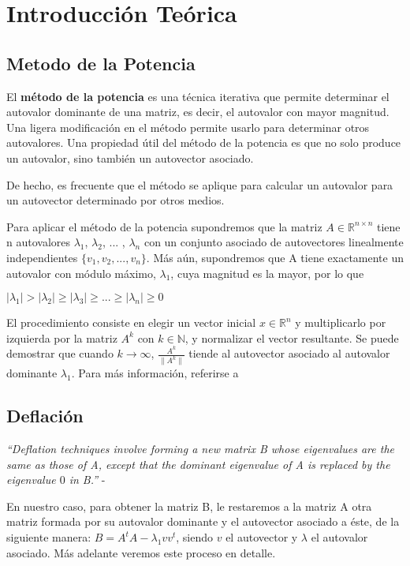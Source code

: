 \section{Introducci\'on Te\'orica}
\subsection{Metodo de la Potencia}
El \textbf{método de la potencia} es una técnica iterativa que permite determinar el autovalor dominante de una matriz, es decir, el autovalor con mayor magnitud. Una ligera modificación en el método permite usarlo para determinar otros autovalores. Una propiedad útil del método de la potencia es que no solo produce un autovalor, sino también un autovector asociado. 

De hecho, es frecuente que el método se aplique para calcular un autovalor para un autovector determinado por otros medios.

Para aplicar el método de la potencia supondremos que la matriz $A \in \mathbb{R}^{n \times n}$ tiene n autovalores $\lambda_1$, $\lambda_2$, ... , $\lambda_n$ con un conjunto asociado de autovectores linealmente independientes $\{v_1,v_2, ..., v_n\}$. Más aún, supondremos que A tiene exactamente un autovalor con módulo máximo, $\lambda_1$, cuya magnitud es la mayor, por lo que 
\begin{center}
$|\lambda_1| > |\lambda_2| \geq |\lambda_3| \geq ... \geq |\lambda_n| \geq 0$
\end{center}

%
%
%
%
%
%

El procedimiento consiste en elegir un vector inicial $x \in \mathbb{R}^n$ y multiplicarlo por
izquierda por la matriz $A^k$ con $k \in \mathbb{N}$, y normalizar el vector resultante. Se puede
demostrar que cuando $k \rightarrow \infty$, $\frac{A^k}{\| A^k \| }$ tiende al autovector asociado
al autovalor  dominante $\lambda_1$. Para más información, referirse a \cite{burden}

\subsection{Deflación}

\textit{``Deflation techniques involve forming a new matrix B whose eigenvalues are the same as
  those of A, except that the dominant eigenvalue of A is replaced by the eigenvalue $0$ in B.''} -
\cite[p.~604]{burden}

En nuestro caso, para obtener la matriz B, le restaremos a la matriz A otra matriz formada por su
autovalor dominante y el autovector asociado a éste, de la siguiente manera: $B = A^t A -
\lambda_{1} v v^t $, siendo $v$ el autovector y $\lambda$ el autovalor asociado. Más adelante
veremos este proceso en detalle.
